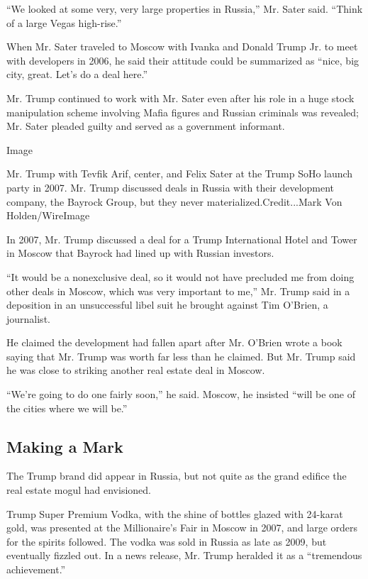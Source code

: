 ``We looked at some very, very large properties in Russia,'' Mr. Sater
said. ``Think of a large Vegas high-rise.''

When Mr. Sater traveled to Moscow with Ivanka and Donald Trump Jr. to
meet with developers in 2006, he said their attitude could be summarized
as ``nice, big city, great. Let's do a deal here.''

Mr. Trump continued to work with Mr. Sater even after his role in a huge
stock manipulation scheme involving Mafia figures and Russian criminals
was revealed; Mr. Sater pleaded guilty and served as a government
informant.

Image

Mr. Trump with Tevfik Arif, center, and Felix Sater at the Trump SoHo
launch party in 2007. Mr. Trump discussed deals in Russia with their
development company, the Bayrock Group, but they never
materialized.Credit...Mark Von Holden/WireImage

In 2007, Mr. Trump discussed a deal for a Trump International Hotel and
Tower in Moscow that Bayrock had lined up with Russian investors.

``It would be a nonexclusive deal, so it would not have precluded me
from doing other deals in Moscow, which was very important to me,'' Mr.
Trump said in a deposition in an unsuccessful libel suit he brought
against Tim O'Brien, a journalist.

He claimed the development had fallen apart after Mr. O'Brien wrote a
book saying that Mr. Trump was worth far less than he claimed. But Mr.
Trump said he was close to striking another real estate deal in Moscow.

``We're going to do one fairly soon,'' he said. Moscow, he insisted
``will be one of the cities where we will be.''

\hypertarget{making-a-mark}{%
\subsection{Making a Mark}\label{making-a-mark}}

The Trump brand did appear in Russia, but not quite as the grand edifice
the real estate mogul had envisioned.

Trump Super Premium Vodka, with the shine of bottles glazed with
24-karat gold, was presented at the Millionaire's Fair in Moscow in
2007, and large orders for the spirits followed. The vodka was sold in
Russia as late as 2009, but eventually fizzled out. In a news release,
Mr. Trump heralded it as a ``tremendous achievement.''

